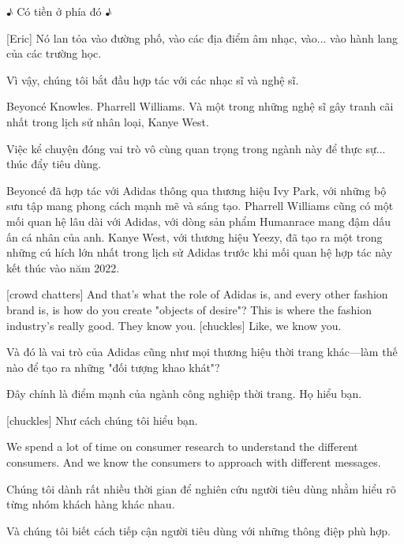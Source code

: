\documentclass[a4paper]{article}
\begin{document}
	\begin{vietnamese-v2}
		♪ Có tiền ở phía đó ♪
		
		[Eric] Nó lan tỏa vào đường phố, vào các địa điểm âm nhạc, vào... vào hành lang của các trường học.
		
		Vì vậy, chúng tôi bắt đầu hợp tác với các nhạc sĩ và nghệ sĩ.
		
		Beyoncé Knowles. Pharrell Williams. Và một trong những nghệ sĩ gây tranh cãi nhất trong lịch sử nhân loại, Kanye West.
		
		Việc kể chuyện đóng vai trò vô cùng quan trọng trong ngành này để thực sự... thúc đẩy tiêu dùng.
		
		Beyoncé đã hợp tác với Adidas thông qua thương hiệu Ivy Park, với những bộ sưu tập mang phong cách mạnh mẽ và sáng tạo. Pharrell Williams cũng có một mối quan hệ lâu dài với Adidas, với dòng sản phẩm Humanrace mang đậm dấu ấn cá nhân của anh. Kanye West, với thương hiệu Yeezy, đã tạo ra một trong những cú hích lớn nhất trong lịch sử Adidas trước khi mối quan hệ hợp tác này kết thúc vào năm 2022.
	\end{vietnamese-v2}
	
	[crowd chatters]
	And that's what the role of Adidas is, and every other fashion brand is, is how do you create "objects of desire"?
	This is where the fashion industry's really good. They know you.
	[chuckles] Like, we know you.
	
	\begin{vietnamese-v2}
		
		Và đó là vai trò của Adidas cũng như mọi thương hiệu thời trang khác—làm thế nào để tạo ra những "đối tượng khao khát"?
		
		Đây chính là điểm mạnh của ngành công nghiệp thời trang. Họ hiểu bạn.
		
		[chuckles] Như cách chúng tôi hiểu bạn.
	\end{vietnamese-v2}
	
	We spend a lot of time on consumer research to understand the different consumers.
	And we know the consumers to approach with different messages.
	
	\begin{vietnamese-v2}
		Chúng tôi dành rất nhiều thời gian để nghiên cứu người tiêu dùng nhằm hiểu rõ từng nhóm khách hàng khác nhau.  
		
		Và chúng tôi biết cách tiếp cận người tiêu dùng với những thông điệp phù hợp.
	\end{vietnamese-v2}
	
\end{document}
